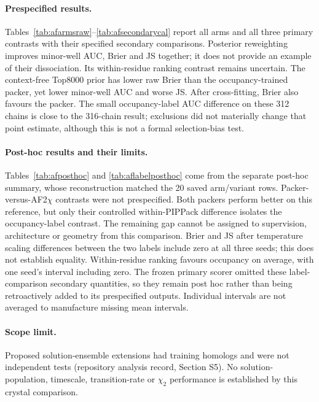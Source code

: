 \documentclass[10pt,a4paper]{article}
\begin{document}
\paragraph{Prespecified results.} Tables~\ref{tab:afarmsraw}--\ref{tab:afsecondarycal}
report all arms and all three primary contrasts with their specified secondary
comparisons. Posterior reweighting improves minor-well AUC, Brier and JS together;
it does not provide an example of their dissociation. Its within-residue ranking
contrast remains uncertain. The context-free Top8000 prior has lower raw Brier than
the occupancy-trained packer, yet lower minor-well AUC and worse JS. After cross-fitting,
Brier also favours the packer. The small occupancy-label AUC difference on these 312
chains is close to the 316-chain result; exclusions did not materially change that
point estimate, although this is not a formal selection-bias test.

\paragraph{Post-hoc results and their limits.} Tables~\ref{tab:afposthoc} and
\ref{tab:aflabelposthoc} come from the separate post-hoc summary, whose reconstruction
matched the 20 saved arm/variant rows. Packer-versus-AF2$\chi$ contrasts were not
prespecified. Both packers perform better on this reference, but only their controlled
within-PIPPack difference isolates the occupancy-label contrast. The remaining gap
cannot be assigned to supervision, architecture or geometry from this comparison.
Brier and JS after temperature scaling differences between the two labels include zero at all three
seeds; this does not establish equality. Within-residue ranking favours occupancy
on average, with one seed's interval including zero. The frozen primary scorer omitted
these label-comparison secondary quantities, so they remain post hoc rather than
being retroactively added to its prespecified outputs. Individual intervals are not
averaged to manufacture missing mean intervals.

\paragraph{Scope limit.} Proposed solution-ensemble extensions had training homologs and were not independent tests (repository analysis record, Section S5). No solution-population, timescale, transition-rate or $\chi_2$ performance is established by this crystal comparison.
\end{document}
